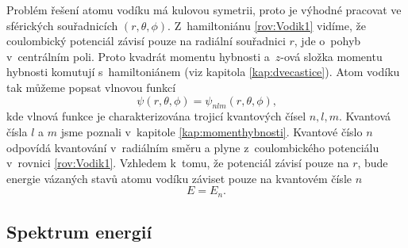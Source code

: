 Problém řešení atomu vodíku má kulovou symetrii, proto je výhodné pracovat ve sférických souřadnicích $(r, \theta, \phi)$. Z~hamiltoniánu \eqref{rov:Vodik1} vidíme, že coulombický potenciál závisí pouze na radiální souřadnici $r$, jde o~pohyb v~centrálním poli. Proto kvadrát momentu hybnosti a~$z$-ová složka momentu hybnosti komutují s~hamiltoniánem (viz kapitola \ref{kap:dvecastice}). Atom vodíku tak můžeme popsat vlnovou funkcí
\begin{equation}
\psi(r, \theta,\phi) = \psi_{nlm}(r, \theta,\phi) \mbox{,}
\label{rov:Vodik2}
\end{equation} 
kde vlnová funkce je charakterizována trojicí kvantových čísel $n,l,m$. Kvantová čísla $l$ a $m$ jsme poznali v~kapitole \ref{kap:momenthybnosti}. Kvantové číslo $n$ odpovídá kvantování v~radiálním směru a plyne z~coulombického potenciálu v~rovnici \eqref{rov:Vodik1}. Vzhledem k~tomu, že potenciál závisí pouze na $r$, bude energie vázaných stavů atomu vodíku záviset pouze na kvantovém čísle $n$
\begin{equation}
E = E_n \mbox{.}
\label{rov:Vodik3}
\end{equation}

\subsection{Spektrum energií}
\label{kap:SpektrumEnergii}

